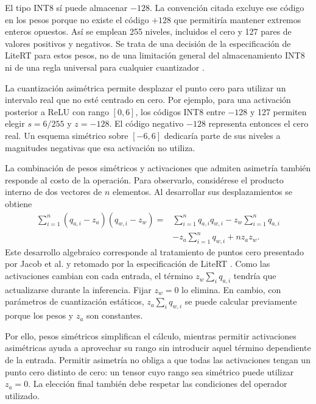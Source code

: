 El tipo INT8 sí puede almacenar $-128$. La convención citada excluye ese código en los pesos porque no existe el código $+128$ que permitiría mantener extremos enteros opuestos. Así se emplean 255 niveles, incluidos el cero y 127 pares de valores positivos y negativos. Se trata de una decisión de la especificación de LiteRT para estos pesos, no de una limitación general del almacenamiento INT8 ni de una regla universal para cualquier cuantizador \cite{litertspec}.

La cuantización asimétrica permite desplazar el punto cero para utilizar un intervalo real que no esté centrado en cero. Por ejemplo, para una activación posterior a ReLU con rango $[0,6]$, los códigos INT8 entre $-128$ y 127 permiten elegir $s=6/255$ y $z=-128$. El código negativo $-128$ representa entonces el cero real. Un esquema simétrico sobre $[-6,6]$ dedicaría parte de sus niveles a magnitudes negativas que esa activación no utiliza.

La combinación de pesos simétricos y activaciones que admiten asimetría también responde al costo de la operación. Para observarlo, considérese el producto interno de dos vectores de $n$ elementos. Al desarrollar sus desplazamientos se obtiene
\begin{equation}
\begin{aligned}
\sum_{i=1}^{n}(q_{a,i}-z_a)(q_{w,i}-z_w)
={}&\sum_{i=1}^{n}q_{a,i}q_{w,i}-z_w\sum_{i=1}^{n}q_{a,i}\\
&-z_a\sum_{i=1}^{n}q_{w,i}+nz_az_w.
\end{aligned}
\label{eq:cap3_productoz}
\end{equation}
Este desarrollo algebraico corresponde al tratamiento de puntos cero presentado por Jacob et al. y retomado por la especificación de LiteRT \cite{jacob2018,litertspec}. Como las activaciones cambian con cada entrada, el término $z_w\sum_iq_{a,i}$ tendría que actualizarse durante la inferencia. Fijar $z_w=0$ lo elimina. En cambio, con parámetros de cuantización estáticos, $z_a\sum_iq_{w,i}$ se puede calcular previamente porque los pesos y $z_a$ son constantes.

Por ello, pesos simétricos simplifican el cálculo, mientras permitir activaciones asimétricas ayuda a aprovechar su rango sin introducir aquel término dependiente de la entrada. Permitir asimetría no obliga a que todas las activaciones tengan un punto cero distinto de cero: un tensor cuyo rango sea simétrico puede utilizar $z_a=0$. La elección final también debe respetar las condiciones del operador utilizado.

